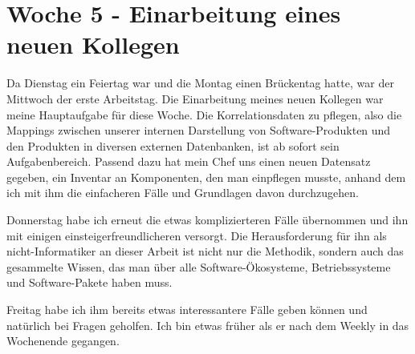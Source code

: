 \section{Woche 5 - Einarbeitung eines neuen Kollegen} \label{sec:bericht-wo-5}


\lweekdaymarginpar{\weekdayWednesdayLong}

Da Dienstag ein Feiertag war und die {\metaeffekt} Montag einen Brückentag hatte, war der Mittwoch der erste Arbeitstag.
Die Einarbeitung meines neuen Kollegen war meine Hauptaufgabe für diese Woche.
Die Korrelationsdaten zu pflegen, also die Mappings zwischen unserer internen Darstellung von Software-Produkten und den Produkten in diversen externen Datenbanken, ist ab sofort sein Aufgabenbereich.
Passend dazu hat mein Chef uns einen neuen Datensatz gegeben, ein Inventar an Komponenten, den man einpflegen musste, anhand dem ich mit ihm die einfacheren Fälle und Grundlagen davon durchzugehen.

\sweekdaymarginpar{\weekdayThursdayLong}

Donnerstag habe ich erneut die etwas komplizierteren Fälle übernommen und ihn mit einigen einsteigerfreundlicheren versorgt.
Die Herausforderung für ihn als nicht-Informatiker an dieser Arbeit ist nicht nur die Methodik, sondern auch das gesammelte Wissen, das man über alle Software-Ökosysteme, Betriebssysteme und Software-Pakete haben muss.

\sweekdaymarginpar{\weekdayFridayLong}

Freitag habe ich ihm bereits etwas interessantere Fälle geben können und natürlich bei Fragen geholfen.
Ich bin etwas früher als er nach dem Weekly in das Wochenende gegangen.
